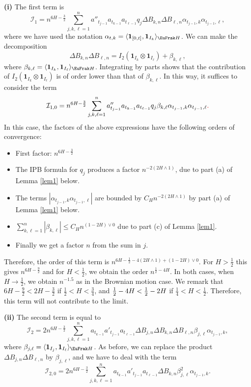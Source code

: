 \documentclass[a4paper]{article}
\newcommand{\colred}{\color[rgb]{0.8,0,0}}
\newcommand{\colred}{\color{black}}%
\numberwithin{equation}{section}
\def\HH{\EuFrak H}
\begin{document}
{ \medskip
 \noindent
 {\bf (i)} The first term is
 \[
 \mathcal{I}_1=n^{6H-\frac 32}  \sum_{j,k,\ell=1}^n a''_{t_{j-1}} a_{t_{k-1}} a_{t_{\ell-1}}  q_j   \Delta  B_{k,n} \Delta  B_{\ell,n}  \alpha_{t_{j-1},k} \alpha_{t_{j-1},\ell},
 \]
 where we have used the notation $\alpha_{t,k} = \langle  \mathbf{1}_{[0,t]}, \mathbf{1}_{I_k} \rangle_{\HH}$.  
 We can make the decomposition
 \[
 \Delta  B_{k,n} \Delta  B_{\ell,n}=  I_2(\mathbf{1}_{I_k} \otimes \mathbf{1}_{I_\ell}) + \beta_{k,\ell},
 \]
 where  $\beta_{k,\ell} =\langle \mathbf{1}_{I_k}, \mathbf{1}_{I_\ell} \rangle_{\HH}$. Integrating by parts shows that the contribution of
 $ I_2(\mathbf{1}_{I_k} \otimes \mathbf{1}_{I_\ell}) $ is of order lower than that of $ \beta_{k,\ell}$. In this way, it suffices to consider the term
  \[
 \mathcal{I}_{1,0}=n^{6H-\frac 32}  \sum_{j,k,\ell=1}^n a''_{t_{j-1}} a_{t_{k-1}} a_{t_{\ell-1}}  q_j   \beta_{k,\ell}  \alpha_{t_{j-1},k} \alpha_{t_{j-1},\ell}{\colred .}
 \]
  In this case, the factors of the above expressions have  the following orders of convergence:
 \begin{itemize}
 \item First factor: $n^{6H-\frac 32} $
 \item  The  IPB formula  for $q_j$ produces a factor $n^{-2(2H\wedge 1)}$, due to part (a) of Lemma \ref{lem1} below.
 \item   The terms   $| \alpha_{t_{j-1},k} \alpha_{t_{j-1},\ell}|$ are bounded by $C_Hn ^{-2(2H\wedge 1)}$ by part (a) of Lemma \ref{lem1} below.
 \item  $\sum_{k,\ell=1}^n  | \beta_{k,\ell}|  \le C_H n^{(1-2H) \vee 0}$ due to part (c)  of Lemma \ref{lem1}.
 \item Finally we get a factor $n$ from the sum in $j$.
 \end{itemize}
 Therefore, the order of this term is $n^{6H -\frac 12 -4(2H\wedge 1) +(1-2H) \vee 0}$. For $H>\frac 12$ this gives $n^{6H-\frac 92}$  and for
 $H<\frac 12$, we obtain the order $n^{\frac 12-4H}$. In both cases, when $H\to \frac 12$, we obtain $n^{-1.5}$ as in the Brownian motion case. 
 We remark that $6H-\frac{9}{2}<2H-\frac{3}{2}$ if $\frac 12 < H<\frac{3}{4}$, and 
$\frac{1}{2}-4H<\frac{1}{2}-2H$ if $\frac{1}{4} <H< \frac 12$. 
Therefore, this term will not contribute to the limit.
 
 \medskip
 \noindent
 {\bf  (ii)}  The second term is equal to
\[
 \mathcal{I}_2 = 2n^{6H-\frac 32}   \sum_{j,k,\ell=1}^n   a_{t_{k-1}} a'_{t_{j-1}}  a_{t_{\ell-1}}   \Delta B_{j,n}   \Delta B_{k,n}   \Delta B_{\ell,n}   \beta_{j,\ell} \alpha_{t_{j-1},k},
\]
where $\beta_{j,\ell} =\langle \mathbf{1}_{I_j}, \mathbf{1}_{I_\ell} \rangle_{\HH}$.
As before, we can replace the product $ \Delta B_{j,n} \Delta B_{\ell,n} $ by $\beta_{j,\ell}$, and we have to deal with the term
\[
 \mathcal{I}_{2,0} = 2n^{6H-\frac 32}   \sum_{j,k,\ell=1}^n   a_{t_{k-1}} a'_{t_{j-1}}  a_{t_{\ell-1}}     \Delta B_{k,n}      \beta_{j,\ell}^2 \alpha_{t_{j-1},k}.
\]



}
\end{document}

